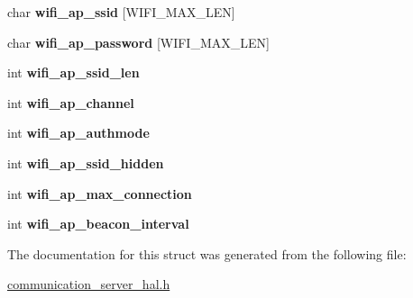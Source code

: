 \begin{DoxyCompactItemize}
\item 
char {\bfseries wifi\+\_\+ap\+\_\+ssid} \mbox{[}W\+I\+F\+I\+\_\+\+M\+A\+X\+\_\+\+L\+EN\mbox{]}\hypertarget{structwifi__config_a18873f6a555ac89eda502a10b2e1e328}{}\label{structwifi__config_a18873f6a555ac89eda502a10b2e1e328}

\item 
char {\bfseries wifi\+\_\+ap\+\_\+password} \mbox{[}W\+I\+F\+I\+\_\+\+M\+A\+X\+\_\+\+L\+EN\mbox{]}\hypertarget{structwifi__config_acc92d3cf0e448cd6b241ed84c11188e1}{}\label{structwifi__config_acc92d3cf0e448cd6b241ed84c11188e1}

\item 
int {\bfseries wifi\+\_\+ap\+\_\+ssid\+\_\+len}\hypertarget{structwifi__config_a842ab9a0b71e5baf177a25400502fb4e}{}\label{structwifi__config_a842ab9a0b71e5baf177a25400502fb4e}

\item 
int {\bfseries wifi\+\_\+ap\+\_\+channel}\hypertarget{structwifi__config_ad1560f38b93d350ea424f7ca2e9fdd68}{}\label{structwifi__config_ad1560f38b93d350ea424f7ca2e9fdd68}

\item 
int {\bfseries wifi\+\_\+ap\+\_\+authmode}\hypertarget{structwifi__config_a62eb76217519bdfd4522cdeffc139e11}{}\label{structwifi__config_a62eb76217519bdfd4522cdeffc139e11}

\item 
int {\bfseries wifi\+\_\+ap\+\_\+ssid\+\_\+hidden}\hypertarget{structwifi__config_ad9d4ffbfe5fe6b4dd536a4ac412eedeb}{}\label{structwifi__config_ad9d4ffbfe5fe6b4dd536a4ac412eedeb}

\item 
int {\bfseries wifi\+\_\+ap\+\_\+max\+\_\+connection}\hypertarget{structwifi__config_ac9c57b9c05351fa65070f7f084908695}{}\label{structwifi__config_ac9c57b9c05351fa65070f7f084908695}

\item 
int {\bfseries wifi\+\_\+ap\+\_\+beacon\+\_\+interval}\hypertarget{structwifi__config_a961c6db684f51d9c6e316cdf11258709}{}\label{structwifi__config_a961c6db684f51d9c6e316cdf11258709}

\end{DoxyCompactItemize}


The documentation for this struct was generated from the following file\+:\begin{DoxyCompactItemize}
\item 
\hyperlink{communication__server__hal_8h}{communication\+\_\+server\+\_\+hal.\+h}\end{DoxyCompactItemize}
